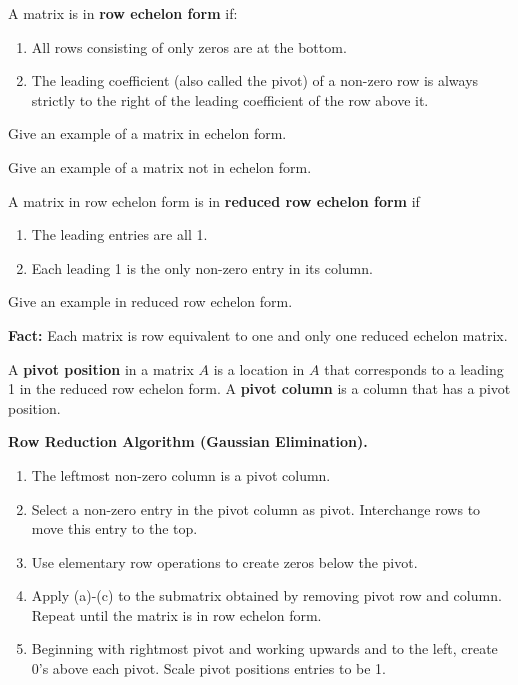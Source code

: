 \newpage

\begin{defn}
A matrix is in {\bf row echelon form} if:
\begin{enumerate}
\item All rows consisting of only zeros are at the bottom.
\item The leading coefficient (also called the pivot) of a non-zero row is always strictly to the right of the leading coefficient of the row above it.
\end{enumerate}
\end{defn}

\begin{enumerate}
  \Problem 
  \Part Give an example of a matrix in echelon form.
  
  \vfill
  
  \Part Give an example of a matrix not in echelon form.

\vfill

\begin{defn}
A matrix in row echelon form is in {\bf reduced row echelon form} if 
\begin{enumerate}
\item The leading entries are all 1.
\item Each leading 1 is the only non-zero entry in its column.
\end{enumerate}
\end{defn}

\Part Give an example in reduced row echelon form.

\vfill

\newpage

{\bf Fact:} Each matrix is row equivalent to one and only one reduced echelon matrix.

\begin{defn}
A {\bf pivot position} in a matrix $A$ is a location in $A$ that corresponds to a leading 1 in the reduced row echelon form. A {\bf pivot column} is a column that has a pivot position. 
\end{defn}

{\bf Row Reduction Algorithm (Gaussian Elimination).}
\begin{enumerate}
\item The leftmost non-zero column is a pivot column.
\item Select a non-zero entry in the pivot column as pivot. Interchange rows to move this entry to the top.
\item Use elementary row operations to create zeros below the pivot.
\item Apply (a)-(c) to the submatrix obtained by removing pivot row and column. %
Repeat until the matrix is in row echelon form.
\item Beginning with rightmost pivot and working upwards and to the left, create 0's above each pivot. Scale pivot positions entries to be 1.
\end{enumerate}


\end{enumerate}
